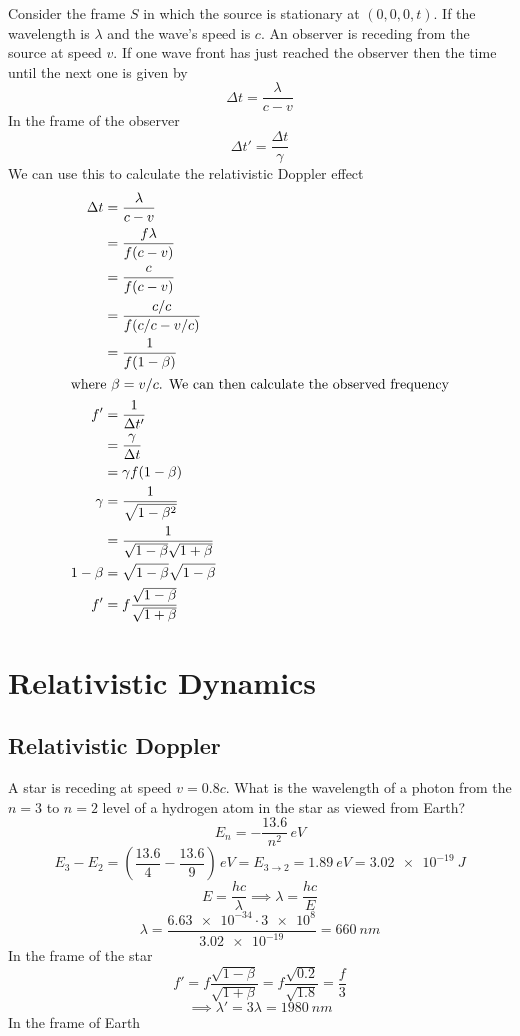 \documentclass{article}
\begin{document}
    Consider the frame \(S\) in which the source is stationary at \((0, 0, 0, t)\). 
    If the wavelength is \(\lambda\) and the wave's speed is \(c\). 
    An observer is receding from the source at speed \(v\). 
    If one wave front has just reached the observer then the time until the next one is given by
    \[\Delta t = \frac{\lambda}{c - v}\]
    In the frame of the observer
    \[\Delta t' = \frac{\Delta t}{\gamma}\]
    We can use this to calculate the relativistic Doppler effect
    \begin{align*}
        \Delta t &= \frac{\lambda}{c - v}\\
        &= \frac{f\lambda}{f(c - v)}\\
        &= \frac{c}{f(c - v)}\\
        &= \frac{c/c}{f(c/c - v/c)}\\
        &= \frac{1}{f(1 - \beta)}\\
        \intertext{where \(\beta = v/c\). We can then calculate the observed frequency}
        f' &= \frac{1}{\Delta t'}\\
        &= \frac{\gamma}{\Delta t}\\
        &= \gamma f(1 - \beta)\\
        \gamma &= \frac{1}{\sqrt{1 - \beta^2}}\\
        &= \frac{1}{\sqrt{1 - \beta}\sqrt{1 + \beta}}\\
        1 - \beta &= \sqrt{1 - \beta}\sqrt{1 - \beta}\\
        f' &= f\frac{\sqrt{1 - \beta}}{\sqrt{1 + \beta}}
    \end{align*}
    
    \section{Relativistic Dynamics}
    \subsection{Relativistic Doppler}
    A star is receding at speed \(v = 0.8c\). 
    What is the wavelength of a photon from the \(n=3\) to \(n=2\) level of a hydrogen atom in the star as viewed from Earth?
    \[E_n = -\frac{13.6}{n^2}\,\si{eV}\]
    \[E_3 - E_2 = \left(\frac{13.6}{4} - \frac{13.6}{9}\right)\,\si{eV} = E_{3\to 2} = \SI{1.89}{eV} = \SI{3.02e-19}{J}\]
    \[E = \frac{hc}{\lambda}\implies \lambda = \frac{hc}{E}\]
    \[\lambda = \frac{\num{6.63e-34}\cdot \num{3e8}}{\num{3.02e-19}} = \SI{660}{nm}\]
    In the frame of the star
    \[f'=f\frac{\sqrt{1 - \beta}}{\sqrt{1 + \beta}} = f\frac{\sqrt{0.2}}{\sqrt{1.8}} = \frac{f}{3}\]
    \[\implies \lambda' = 3\lambda = \SI{1980}{nm}\]
    In the frame of Earth
    
\end{document}
